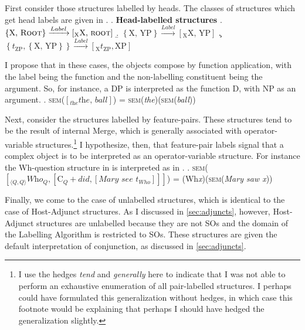 \documentclass[MilwayThesis]{subfiles}
\begin{document}
First consider those structures labelled by heads.
The classes of structures which get head labels are given in \Next.
\ex. \textbf{Head-labelled structures}
\a. $\left\{ \text{X, }\textsc{Root} \right\} \xrightarrow{Label} \left[_\text{X} \text{X, }\textsc{root}  \right]$
\b. $\left\{ \text{X, YP} \right\} \xrightarrow{Label} \left[_\text{X} \text{X, YP} \right]$
\c. $\left\{ t_\text{ZP}, \left\{ \text{X, YP} \right\} \right\}\xrightarrow{Label}\left[_\text{X} t_\text{ZP}, \text{XP} \right]$

I propose that in these cases, the objects compose by function application, with the label being the function and the non-labelling constituent being the argument.
So, for instance, a DP is interpreted as the function D, with NP as an argument.
\ex. \textsc{sem}($\left[_\textit{the} \textit{the, ball} \right]$) = \textsc{sem}(\textit{the})(\textsc{sem}(\textit{ball}))

Next, consider the structures labelled by feature-pairs.
These structures tend to be the result of internal Merge, which is generally associated with operator-variable structures.\footnote{
	I use the hedges \textit{tend} and \textit{generally} here to indicate that I was not able to perform an exhaustive enumeration of all pair-labelled structures.
	I perhaps could have formulated this generalization without hedges, in which case this footnote would be explaining that perhaps I should have hedged the generalization slightly.
}
I hypothesize, then, that feature-pair labels signal that a complex object is to be interpreted as an operator-variable structure.
For instance the Wh-question structure in \Next[a] is interpreted as in \Next[b].
\ex. \textsc{sem}($\left[_{\langle Q,Q \rangle} \textit{Who}_Q, \left[ \text{C}_Q+\textit{did}, \left[ \textit{Mary see } t_{Who} \right] \right]  \right]$) = (Wh\textit{x})(\textsc{sem}(\textit{Mary saw x}))

Finally, we come to the case of unlabelled structures, which is identical to the case of Host-Adjunct structures.
As I discussed in \cref{sec:adjuncts}, however, Host-Adjunct structures are unlabelled because they are not SOs and the domain of the Labelling Algorithm is restricted to SOs.
These structures are given the default interpretation of conjunction, as discussed in \cref{sec:adjuncts}.
\end{document}
